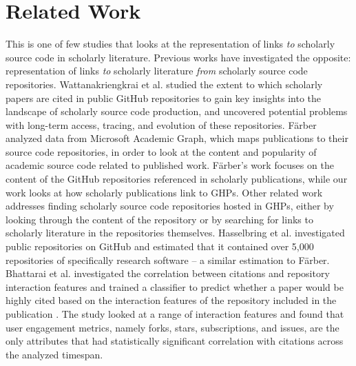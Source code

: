 \chapter{Related Work}
\label{ch:relatedwork}


This is one of few studies that looks at the representation of links \textit{to} scholarly source code in scholarly literature. Previous works have investigated the opposite: representation of links \textit{to} scholarly literature \textit{from} scholarly source code repositories. Wattanakriengkrai et al. \cite{wattanakriengkrai_github_2022} studied the extent to which scholarly papers are cited in public GitHub repositories to gain key insights into the landscape of scholarly source code production, and uncovered potential problems with long-term access, tracing, and evolution of these repositories. Färber \cite{farber-jcdl2020} analyzed data from Microsoft Academic Graph, which maps publications to their source code repositories, in order to look at the content and popularity of academic source code related to published work. Färber's work focuses on the content of the GitHub repositories referenced in scholarly publications, while our work looks at how scholarly publications link to GHPs. Other related work addresses finding scholarly source code repositories hosted in GHPs, either by looking through the content of the repository or by searching for links to scholarly literature in the repositories themselves. Hasselbring et al. \cite{hasselbring} investigated public repositories on GitHub and estimated that it contained over 5,000 repositories of specifically research software -- a similar estimation to Färber. Bhattarai et al. investigated the correlation between citations and repository interaction features and trained a classifier to predict whether a paper would be highly cited based on the interaction features of the repository included in the publication \cite{bhattarai-jcdl2022}. The study looked at a range of interaction features and found that user engagement metrics, namely forks, stars, subscriptions, and issues, are the only attributes that had statistically significant correlation with citations across the analyzed timespan. 


